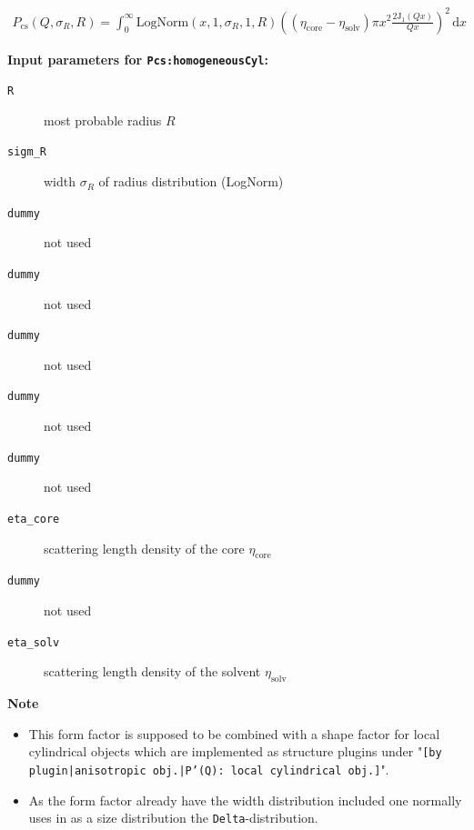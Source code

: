 \begin{align}
P_\text{cs}(Q,\sigma_{R},R) = \int_0^\infty \textrm{LogNorm}(x,1,\sigma_{R},1,R) \left( \left(\eta_\textrm{core}-\eta_\textrm{solv}\right) \pi x^2 \frac{2 \mathrm{J}_1(Qx)}{Qx} \right)^2 \, \textrm{d}x
\end{align}

\noindent
\textbf{Input parameters for \texttt{Pcs:homogeneousCyl}:}
\begin{description}
    \item[\texttt{R}] most probable radius $R$
    \item[\texttt{sigm\_R}] width $\sigma_R$ of radius distribution (LogNorm)
    \item[\texttt{dummy}] not used
    \item[\texttt{dummy}] not used
    \item[\texttt{dummy}] not used
    \item[\texttt{dummy}] not used
    \item[\texttt{dummy}] not used
    \item[\texttt{eta\_core}] scattering length density of the core $\eta_\textrm{core}$
    \item[\texttt{dummy}] not used
    \item[\texttt{eta\_solv}] scattering length density of the solvent $\eta_\textrm{solv}$
\end{description}

\noindent
\textbf{Note}
\begin{itemize}
  \item This form factor is supposed to be combined with a shape factor for
local cylindrical objects which are implemented as structure  plugins
under "\texttt{[by plugin|anisotropic obj.|P'(Q): local cylindrical obj.]}".
\item As the form factor already have the width distribution included one normally uses in \SASfit as a size distribution
the \texttt{Delta}-distribution.
\end{itemize}

